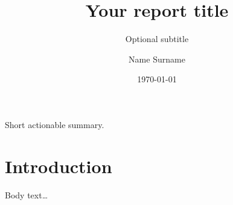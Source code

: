 \documentclass[apm-report]{avient}
\title{Your report title}
\subtitle{Optional subtitle}
\author{Name Surname}
\date{\today}
\begin{document}
\maketitle

\begin{executivesummary}
Short actionable summary.
\end{executivesummary}

\section{Introduction}
Body text…
\end{document}
